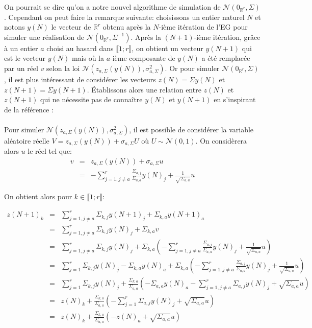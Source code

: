 On pourrait se dire qu'on a notre nouvel algorithme de simulation de $\mathcal{N}(0_{\mathbb{R}^{r}},\Sigma)$. Cependant on peut faire la remarque suivante:
choisissons un entier naturel $N$ et notons $y(N)$ le vecteur de $\mathbb{R}^r$ obtenu après la $N$-ième itération de l'EG pour simuler
une réalisation de  $\mathcal{N}(0_{\mathbb{R}^{r}},\Sigma^{-1})$. Après la \mbox{$(N+1)$-ième} itération, grâce à un entier $a$ choisi au hasard dans $\llbracket 1;r \rrbracket$,
on obtient un vecteur $y(N+1)$ qui est le vecteur $y(N)$ mais où la $a$-ième composante de $y(N)$ a été remplacée par un réel $v$ selon la loi $\mathcal{N}(z_{a,\Sigma}(y(N)), \sigma_{a,\Sigma}^2)$.
Or pour simuler $\mathcal{N}(0_{\mathbb{R}^{r}},\Sigma)$, il est plus intéressant de considérer les vecteurs $z(N) = \Sigma y(N)$
et $z(N+1) = \Sigma y(N+1)$. \'Etablissons alors une relation entre $z(N)$ et $z(N+1)$ qui ne nécessite pas de connaître $y(N)$ et $y(N+1)$ en s'inspirant de la référence \cite{Lantujoul2012SimulationOA}:\\
~\\
Pour simuler $\mathcal{N}(z_{a,\Sigma}(y(N)), \sigma_{a,\Sigma}^2)$, il est possible de considérer la variable aléatoire réelle $V = z_{a,\Sigma}(y(N)) +  \sigma_{a,\Sigma}U$ où
$U \sim \mathcal{N}(0,1)$. On considèrera alors $u$ le réel tel que:
\begin{eqnarray*}
v & = & z_{a,\Sigma}(y(N)) +  \sigma_{a,\Sigma}u \\
& = &-\displaystyle\sum_{j = 1, j \neq a}^{r} \frac{\Sigma_{a,j}}{\Sigma_{a,a}} y(N)_j + \frac{1}{\sqrt{\Sigma_{a,a}}} u
\end{eqnarray*}

\noindent On obtient alors pour $k \in \llbracket 1;r \rrbracket$:

\begin{eqnarray*}
z(N+1)_k & = & \displaystyle\sum_{j = 1, j \neq a}^{r} \Sigma_{k,j} y(N+1)_j + \Sigma_{k,a} y(N+1)_a \\
& = & \displaystyle\sum_{j = 1, j \neq a}^{r} \Sigma_{k,j} y(N)_j + \Sigma_{k,a} v \\
& = & \displaystyle\sum_{j = 1, j \neq a}^{r} \Sigma_{k,j} y(N)_j + \Sigma_{k,a} ( -\displaystyle\sum_{j = 1, j \neq a}^{r} \frac{\Sigma_{a,j}}{\Sigma_{a,a}} y(N)_j + \frac{1}{\sqrt{\Sigma_{a,a}}} u) \\
& = & \displaystyle\sum_{j = 1}^{r} \Sigma_{k,j} y(N)_j - \Sigma_{k,a} y(N)_a + \Sigma_{k,a} ( -\displaystyle\sum_{j = 1, j \neq a}^{r} \frac{\Sigma_{a,j}}{\Sigma_{a,a}} y(N)_j + \frac{1}{\sqrt{\Sigma_{a,a}}} u) \\
& = & \displaystyle\sum_{j = 1}^{r} \Sigma_{k,j} y(N)_j + \frac{\Sigma_{k,a}}{\Sigma_{a,a}} ( -\Sigma_{a,a}y(N)_a - \displaystyle\sum_{j = 1, j \neq a}^{r} \Sigma_{a,j}y(N)_j + \sqrt{\Sigma_{a,a}} u)\\
& = & z(N)_k + \frac{\Sigma_{k,a}}{\Sigma_{a,a}} ( -\displaystyle\sum_{j = 1}^{r} \Sigma_{a,j}y(N)_j + \sqrt{\Sigma_{a,a}} u)\\
& = & z(N)_k + \frac{\Sigma_{k,a}}{\Sigma_{a,a}} ( -z(N)_a + \sqrt{\Sigma_{a,a}} u) 
\end{eqnarray*}

